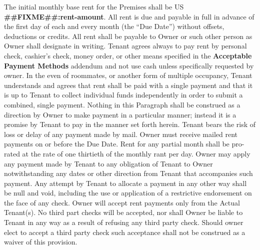 \documentclass[8pt, letterpaper, oneside]{extarticle}
\newcounter{para}
\newcommand\numparagraph{\par\refstepcounter{para}\textbf{\thepara}\hspace{5mm}}
\begin{document}
 \numparagraph{\textbf{RENT:}\hspace{2mm}} The initial monthly base rent for the Premises shall be US \textbf{\#\#FIXME\#\#:rent-amount}. All rent is due and payable in full in advance of the first day of each and every month (the ``Due Date'') without offsets, deductions or credits. All rent shall be payable to Owner or such other person as Owner shall designate in writing. Tenant agrees always to pay rent by personal check, cashier's check, money order, or other means specified in the \textbf{Acceptable Payment Methods} addendum and not use cash unless specifically requested by owner. In the even of roommates, or another form of multiple occupancy, Tenant understands and agrees that rent shall be paid with a single payment and that it is up to Tenant to collect individual funds independently in order to submit a combined, single payment. Nothing in this Paragraph shall be construed as a direction by Owner to make payment in a particular manner; instead it is a promise by Tenant to pay in the manner set forth herein. Tenant bears the risk of loss or delay of any payment made by mail. Owner must receive mailed rent payments on or before the Due Date. Rent for any partial month shall be pro-rated at the rate of one thirtieth of the monthly rant per day. Owner may apply any payment made by Tenant to any obligation of Tenant to Owner notwithstanding any dates or other direction from Tenant that accompanies such payment. Any attempt by Tenant to allocate a payment in any other way shall be null and void, including the use or application of a restrictive endorsement on the face of any check. Owner will accept rent payments only from the Actual Tenant(s). No third part checks will be accepted, nor shall Owner be liable to Tenant in any way as a result of refusing any third party check. Should owner elect to accept a third party check such acceptance shall not be construed as a waiver of this provision.
\end{document}

